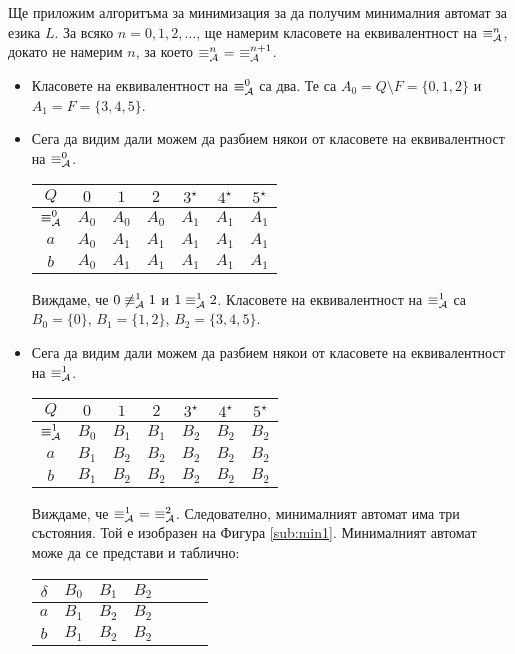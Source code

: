 {\scriptsize
  \begin{hint}
Ще приложим алгоритъма за минимизация за да получим минималния автомат за езика $L$.
За всяко $n = 0,1,2,\dots$, ще намерим класовете на еквивалентност на $\equiv^n_{\mathcal{A}}$,
докато не намерим $n$, за което $\equiv^n_\A\ =\ \equiv^{n+1}_\A$.

\begin{itemize}
\item 
  Класовете на еквивалентност на $\equiv^0_{\mathcal{A}}$ са два.
  Те са $A_0 = Q\setminus F = \{0,1,2\}$ и $A_1 = F = \{3,4,5\}$.
\item
  Сега да видим дали можем да разбием някои от класовете на еквивалентност на $\equiv^0_{\mathcal{A}}$.
  
  \begin{tabular}{|c|c|c|c|c|c|c|}
    \hline
    $Q$ & $0$ & $1$ & $2$ & $3^\star$ & $4^\star$ & $5^\star$ \\
    \hline
    \hline
    $\equiv^0_{\mathcal{A}}$ & $A_0$ & $A_0$ & $A_0$ & $A_1$ & $A_1$ & $A_1$\\
    \hline
    $a$ & $A_0$& $A_1$ & $A_1$ & $A_1$ & $A_1$ & $A_1$\\
    \hline
    $b$ & $A_0$& $A_1$ & $A_1$ & $A_1$ & $A_1$ & $A_1$\\
    \hline
  \end{tabular}

  Виждаме, че $0 \not\equiv^1_{\mathcal{A}} 1$ и $1 \equiv^1_{\mathcal{A}} 2$.
  Класовете на еквивалентност на $\equiv^1_{\mathcal{A}}$ са 
  $B_0 = \{0\}$, $B_1 = \{1,2\}$, $B_2 = \{3,4,5\}$.
\item
  Сега да видим дали можем да разбием някои от класовете на еквивалентност на $\equiv^1_{\mathcal{A}}$.
  
  \begin{tabular}{|c|c|c|c|c|c|c|}
    \hline
    $Q$ & $0$ & $1$ & $2$ & $3^\star$ & $4^\star$ & $5^\star$ \\
    \hline
    \hline
    $\equiv^1_{\mathcal{A}}$ & $B_0$ & $B_1$ & $B_1$ & $B_2$ & $B_2$ & $B_2$\\
    \hline
    $a$ & $B_1$ & $B_2$ & $B_2$ & $B_2$ & $B_2$ & $B_2$\\
    \hline
    $b$ & $B_1$ & $B_2$ & $B_2$ & $B_2$ & $B_2$ & $B_2$\\
    \hline
  \end{tabular}

  Виждаме, че $\equiv^1_\A\ =\ \equiv^2_\A$.
  Следователно, минималният автомат има три състояния.
  Той е изобразен на Фигура \ref{sub:min1}.  
  Минималният автомат може да се представи и таблично:
  
  \begin{tabular}{|c|c|c|c|c|c|c|}
    \hline
    $\delta$ & $B_0$ & $B_1$ & $B_2$ \\
    \hline
    $a$ & $B_1$ & $B_2$ & $B_2$ \\
    \hline
    $b$ & $B_1$ & $B_2$ & $B_2$ \\
    \hline
  \end{tabular}
\end{itemize}
\end{hint}
}

